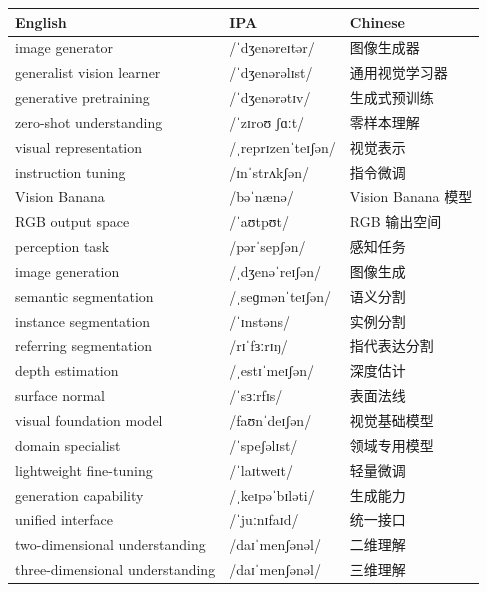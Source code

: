 \documentclass[UTF8,12pt,a4paper]{ctexart}
\providecommand{\zh}[1]{#1}
\begin{document}
\begin{tabular*}{\textwidth}{@{\extracolsep{\fill}}lll@{}}
\toprule
\textbf{English} & \textbf{IPA} & \textbf{Chinese} \\
\midrule
image generator & {\ipafont /ˈdʒenəreɪtər/} & \zh{图像生成器} \\
generalist vision learner & {\ipafont /ˈdʒenərəlɪst/} & \zh{通用视觉学习器} \\
generative pretraining & {\ipafont /ˈdʒenərətɪv/} & \zh{生成式预训练} \\
zero-shot understanding & {\ipafont /ˈzɪroʊ ʃɑːt/} & \zh{零样本理解} \\
visual representation & {\ipafont /ˌreprɪzenˈteɪʃən/} & \zh{视觉表示} \\
instruction tuning & {\ipafont /ɪnˈstrʌkʃən/} & \zh{指令微调} \\
Vision Banana & {\ipafont /bəˈnænə/} & \zh{Vision Banana 模型} \\
RGB output space & {\ipafont /ˈaʊtpʊt/} & \zh{RGB 输出空间} \\
perception task & {\ipafont /pərˈsepʃən/} & \zh{感知任务} \\
image generation & {\ipafont /ˌdʒenəˈreɪʃən/} & \zh{图像生成} \\
semantic segmentation & {\ipafont /ˌseɡmənˈteɪʃən/} & \zh{语义分割} \\
instance segmentation & {\ipafont /ˈɪnstəns/} & \zh{实例分割} \\
referring segmentation & {\ipafont /rɪˈfɜːrɪŋ/} & \zh{指代表达分割} \\
depth estimation & {\ipafont /ˌestɪˈmeɪʃən/} & \zh{深度估计} \\
surface normal & {\ipafont /ˈsɜːrfɪs/} & \zh{表面法线} \\
visual foundation model & {\ipafont /faʊnˈdeɪʃən/} & \zh{视觉基础模型} \\
domain specialist & {\ipafont /ˈspeʃəlɪst/} & \zh{领域专用模型} \\
lightweight fine-tuning & {\ipafont /ˈlaɪtweɪt/} & \zh{轻量微调} \\
generation capability & {\ipafont /ˌkeɪpəˈbɪləti/} & \zh{生成能力} \\
unified interface & {\ipafont /ˈjuːnɪfaɪd/} & \zh{统一接口} \\
two-dimensional understanding & {\ipafont /daɪˈmenʃənəl/} & \zh{二维理解} \\
three-dimensional understanding & {\ipafont /daɪˈmenʃənəl/} & \zh{三维理解} \\

\end{tabular*}
\end{document}
